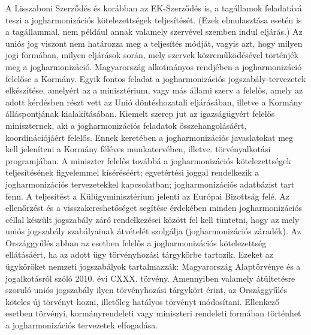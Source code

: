 A Lisszaboni Szerződés és korábban az EK-Szerződés is, a tagállamok feladatává teszi a jogharmonizációs kötelezettségek teljesítését. (Ezek elmulasztása esetén is a tagállammal, nem például annak valamely szervével szemben indul eljárás.) Az uniós jog viszont nem határozza meg a teljesítés módját, vagyis azt, hogy milyen jogi formában, milyen eljárások során, mely szervek közreműködésével történjék meg a jogharmonizáció. Magyarország alkotmányos rendjében a jogharmonizáció felelőse a Kormány. Egyik fontos feladat a jogharmonizációs jogszabály-tervezetek elkészítése, amelyért az a minisztérium, vagy más állami szerv a felelős, amely az adott kérdésben részt vett az Unió döntéshozatali eljárásában, illetve a Kormány álláspontjának kialakításában. Kiemelt szerep jut az igazságügyért felelős miniszternek, aki a jogharmonizációs feladatok összehangolásáért, koordinációjáért felelős. Ennek keretében a jogharmonizációs javaslatokat meg kell jeleníteni a Kormány féléves munkatervében, illetve. törvényalkotási programjában. A miniszter felelős továbbá a jogharmonizációs kötelezettségek teljesítésének figyelemmel kíséréséért; egyetértési joggal rendelkezik a jogharmonizációs tervezetekkel kapcsolatban; jogharmonizációs adatbázist tart fenn. A teljesítést a Külügyminisztérium jelenti az Európai Bizottság felé. Az ellenőrzést és a visszakereshetőséget segítése érdekében minden jogharmonizációs céllal készült jogszabály záró rendelkezései között fel kell tüntetni, hogy az mely uniós jogszabály szabályainak átvételét szolgálja (jogharmonizációs záradék). Az Országgyűlés abban az esetben felelős a jogharmonizációs kötelezettség ellátásáért, ha az adott ügy törvényhozási tárgykörbe tartozik. Ezeket az ügyköröket nemzeti jogszabályok tartalmazzák: Magyarország Alaptörvénye és a jogalkotásról szóló 2010. évi CXXX. törvény. Amennyiben valamely átültetésre szoruló uniós jogszabály ilyen törvényhozási tárgykört érint, az Országgyűlés köteles új törvényt hozni, illetőleg hatályos törvényt módosítani. Ellenkező esetben törvényi, kormányrendeleti vagy miniszteri rendeleti formában történhet a jogharmonizációs tervezetek elfogadása. \cite{jogharmonizacio}